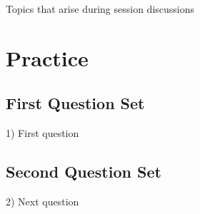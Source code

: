 \documentclass[11pt,a4paper]{article}
\begin{document}
Topics that arise during session discussions

\section{Practice}

\subsection{First Question Set}

1) First question

\subsection{Second Question Set}

2) Next question

\newpage



\end{document}
